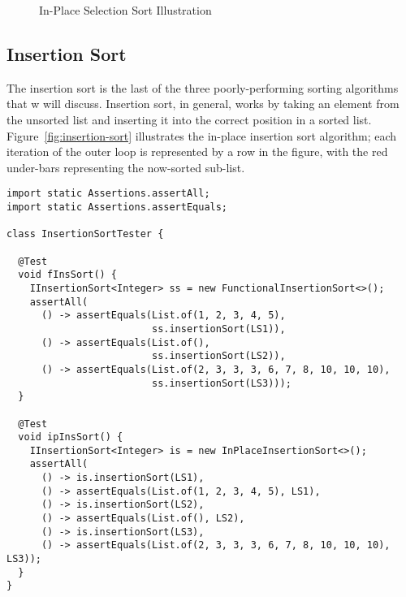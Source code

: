 \begin{figure}[H]
\caption{In-Place Selection Sort Illustration}
\label{fig:selection-sort}
\end{figure}

\subsection{Insertion Sort}
The insertion sort is the last of the three poorly-performing sorting algorithms that w will discuss. 
Insertion sort, in general, works by taking an element from the unsorted list and inserting it into the correct position in a sorted list. 
Figure~\ref{fig:insertion-sort} illustrates the in-place insertion sort algorithm; each iteration of the outer loop is represented by a row in the figure, with the red under-bars representing the now-sorted sub-list.

\enlargethispage{-7\baselineskip}
\begin{lstlisting}[language=MyJava]
import static Assertions.assertAll;
import static Assertions.assertEquals;

class InsertionSortTester {

  @Test
  void fInsSort() {
    IInsertionSort<Integer> ss = new FunctionalInsertionSort<>();
    assertAll(
      () -> assertEquals(List.of(1, 2, 3, 4, 5), 
                         ss.insertionSort(LS1)),
      () -> assertEquals(List.of(), 
                         ss.insertionSort(LS2)),
      () -> assertEquals(List.of(2, 3, 3, 3, 6, 7, 8, 10, 10, 10), 
                         ss.insertionSort(LS3)));
  }

  @Test
  void ipInsSort() {
    IInsertionSort<Integer> is = new InPlaceInsertionSort<>();
    assertAll(
      () -> is.insertionSort(LS1),
      () -> assertEquals(List.of(1, 2, 3, 4, 5), LS1),
      () -> is.insertionSort(LS2),
      () -> assertEquals(List.of(), LS2),
      () -> is.insertionSort(LS3),
      () -> assertEquals(List.of(2, 3, 3, 3, 6, 7, 8, 10, 10, 10), LS3));
  }
}
\end{lstlisting}

